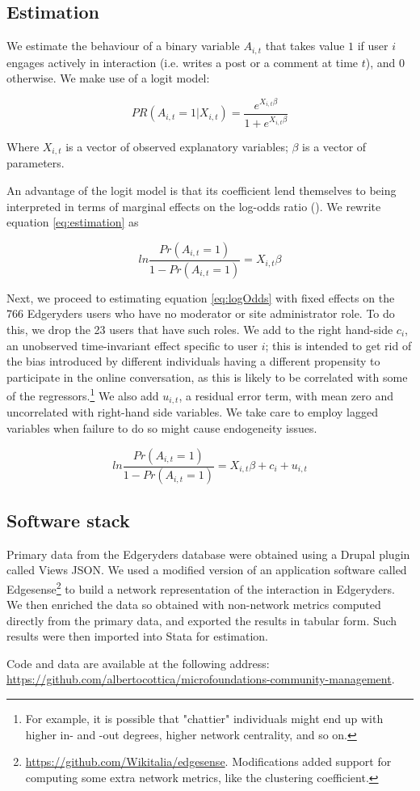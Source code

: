 \subsection{Estimation}

We estimate the behaviour of a binary variable $A_{i,t}$ that takes value $1$ if user $i$ engages actively in interaction (i.e. writes a post or a comment at time $t$), and $0$ otherwise. We make use of a logit model:

\begin{equation}
	PR(A_{i,t}= 1|X_{i,t}) = \frac{e^{X_{i,t}\beta}}{1 + e^{X_{i,t}\beta}}
	\label{eq:estimation}
\end{equation}

Where $X_{i,t}$ is a vector of observed explanatory variables; $\beta$ is a vector of parameters.

An advantage of the logit model is that its coefficient lend themselves to being interpreted in terms of marginal effects on the log-odds ratio (\cite{cameron2005microeconometrics}). We rewrite equation \ref{eq:estimation} as

\begin{equation}
	ln \frac{Pr(A_{i,t} = 1)}{1 - Pr(A_{i,t}=1)} = X_{i,t} \beta 
	\label{eq:logOdds}
\end{equation}

Next, we proceed to estimating equation \ref{eq:logOdds} with fixed effects on the 766 Edgeryders users who have no moderator or site administrator role. To do this, we drop the 23 users that have such roles. We add to the right hand-side
$c_i$, an unobserved time-invariant effect specific to user $i$; this is intended to get rid of the bias introduced by different individuals having a different propensity to participate in the online conversation, as this is likely to be correlated with some of the regressors.\footnote{For example, it is possible that "chattier" individuals might end up with higher in- and -out degrees, higher network centrality, and so on. } We also add $u_{i,t}$, a residual error term, with mean zero and uncorrelated with right-hand side variables. We take care to employ lagged variables when failure to do so might cause endogeneity issues. 

\begin{equation}
	ln \frac{Pr(A_{i,t} = 1)}{1 - Pr(A_{i,t}=1)} = X_{i,t} \beta + c_i + u_{i,t}
	\label{eq:logOddsErrors}
\end{equation}

\subsection{Software stack}
Primary data from the Edgeryders database were obtained using a Drupal plugin called Views JSON. We used a modified version of an application software called Edgesense\footnote{\url{https://github.com/Wikitalia/edgesense}. Modifications added support for computing some extra network metrics, like the clustering coefficient.} to build a network representation of the interaction in Edgeryders. We then enriched the data so obtained with non-network metrics computed directly from the primary data, and exported the results in tabular form. Such results were then imported into Stata for estimation. 

Code and data are available at the following address: \url{https://github.com/albertocottica/microfoundations-community-management}.
